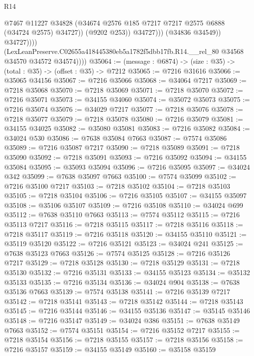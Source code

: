 \begin{lexlean}{R14}
\begin{coremodule}
                              @7467
                              @11227
                              @34828
                              (@34674 @2576 @185 @7217 @7217 @2575 @6888 (@34724 @2575) @34727))
                            (@9202 @253))
                          @34727)))
                    (@34836 @34549))
                  @34727))))
          (LexLeanPreserve.C02655a418445380eb5a1782f5dbb17fb.R14.__rel_80
            @34568
            @34570
            @34572
            @34574))))
@35064 := (message : @6874) -> (size : @35) -> (total : @35) -> (offset : @35) -> @7212
@35065 := @7216 @31616
@35066 := @35065 @34156
@35067 := @7216 @35066
@35068 := @34064 @7217
@35069 := @7218 @35068
@35070 := @7218 @35069
@35071 := @7218 @35070
@35072 := @7216 @35071
@35073 := @34155 @34060
@35074 := @35072 @35073
@35075 := @7216 @35074
@35076 := @34029 @7217
@35077 := @7218 @35076
@35078 := @7218 @35077
@35079 := @7218 @35078
@35080 := @7216 @35079
@35081 := @34155 @34025
@35082 := @35080 @35081
@35083 := @7216 @35082
@35084 := @34024 @530
@35086 := @7638 @35084 @7663
@35087 := @7574 @35086
@35089 := @7216 @35087 @7217
@35090 := @7218 @35089
@35091 := @7218 @35090
@35092 := @7218 @35091
@35093 := @7216 @35092
@35094 := @34155 @35084
@35095 := @35093 @35094
@35096 := @7216 @35095
@35097 := @34024 @342
@35099 := @7638 @35097 @7663
@35100 := @7574 @35099
@35102 := @7216 @35100 @7217
@35103 := @7218 @35102
@35104 := @7218 @35103
@35105 := @7218 @35104
@35106 := @7216 @35105
@35107 := @34155 @35097
@35108 := @35106 @35107
@35109 := @7216 @35108
@35110 := @34024 @699
@35112 := @7638 @35110 @7663
@35113 := @7574 @35112
@35115 := @7216 @35113 @7217
@35116 := @7218 @35115
@35117 := @7218 @35116
@35118 := @7218 @35117
@35119 := @7216 @35118
@35120 := @34155 @35110
@35121 := @35119 @35120
@35122 := @7216 @35121
@35123 := @34024 @241
@35125 := @7638 @35123 @7663
@35126 := @7574 @35125
@35128 := @7216 @35126 @7217
@35129 := @7218 @35128
@35130 := @7218 @35129
@35131 := @7218 @35130
@35132 := @7216 @35131
@35133 := @34155 @35123
@35134 := @35132 @35133
@35135 := @7216 @35134
@35136 := @34024 @904
@35138 := @7638 @35136 @7663
@35139 := @7574 @35138
@35141 := @7216 @35139 @7217
@35142 := @7218 @35141
@35143 := @7218 @35142
@35144 := @7218 @35143
@35145 := @7216 @35144
@35146 := @34155 @35136
@35147 := @35145 @35146
@35148 := @7216 @35147
@35149 := @34024 @386
@35151 := @7638 @35149 @7663
@35152 := @7574 @35151
@35154 := @7216 @35152 @7217
@35155 := @7218 @35154
@35156 := @7218 @35155
@35157 := @7218 @35156
@35158 := @7216 @35157
@35159 := @34155 @35149
@35160 := @35158 @35159

\end{coremodule}
\end{lexlean}
